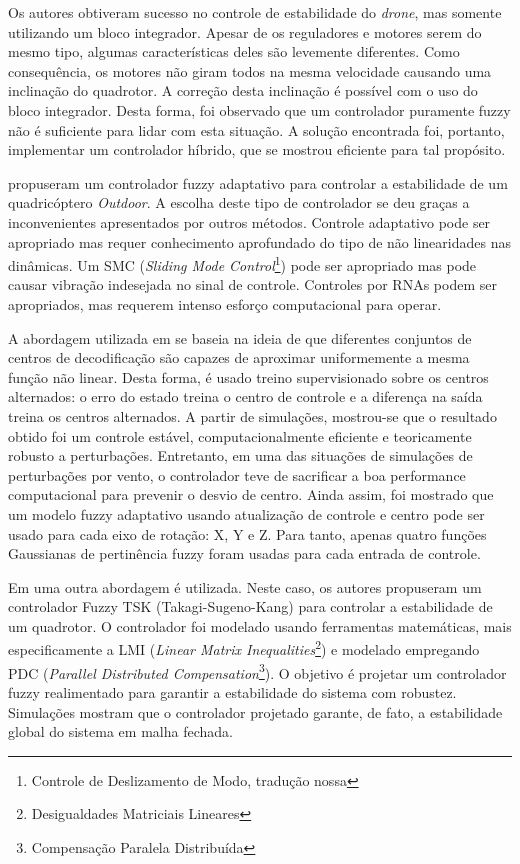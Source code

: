 Os autores obtiveram sucesso no controle de estabilidade do \textit{drone}, mas somente utilizando um bloco integrador. Apesar de os reguladores e motores serem do mesmo tipo, algumas características deles são levemente diferentes. Como consequência, os motores não giram todos na mesma velocidade causando uma inclinação do quadrotor. A correção desta inclinação é possível com o uso do bloco integrador. Desta forma, foi observado que um controlador puramente fuzzy não é suficiente para lidar com esta situação. A solução encontrada foi, portanto, implementar um controlador híbrido, que se mostrou eficiente para tal propósito.

 propuseram um controlador fuzzy adaptativo para controlar a estabilidade de um quadricóptero \textit{Outdoor}. A escolha deste tipo de controlador se deu graças a inconvenientes apresentados por outros métodos. Controle adaptativo pode ser apropriado mas requer conhecimento aprofundado do tipo de não linearidades nas dinâmicas. Um SMC (\textit{Sliding Mode Control}\footnote{Controle de Deslizamento de Modo, tradução nossa}) pode ser apropriado mas pode causar vibração indesejada no sinal de controle. Controles por RNAs podem ser apropriados, mas requerem intenso esforço computacional para operar.

A abordagem utilizada em \cite{Coza2006} se baseia na ideia de que diferentes conjuntos de centros de decodificação são capazes de aproximar uniformemente a mesma função não linear. Desta forma, é usado treino supervisionado sobre os centros alternados: o erro do estado treina o centro de controle e a diferença na saída treina os centros alternados. A partir de simulações, mostrou-se que o resultado obtido foi um controle estável, computacionalmente eficiente e teoricamente robusto a perturbações. Entretanto, em uma das situações de simulações de perturbações por vento, o controlador teve de sacrificar a boa performance computacional para prevenir o desvio de centro. Ainda assim, foi mostrado que um modelo fuzzy adaptativo usando atualização de controle e centro pode ser usado para cada eixo de rotação: X, Y e Z. Para tanto, apenas quatro funções Gaussianas de pertinência fuzzy foram usadas para cada entrada de controle.

Em \cite{Rabhi2011} uma outra abordagem é utilizada. Neste caso, os autores propuseram um controlador Fuzzy TSK (Takagi-Sugeno-Kang) para controlar a estabilidade de um quadrotor. O controlador foi modelado usando ferramentas matemáticas, mais especificamente a LMI (\textit{Linear Matrix Inequalities}\footnote{Desigualdades Matriciais Lineares}) e modelado empregando PDC (\textit{Parallel Distributed Compensation}\footnote{Compensação Paralela Distribuída}). O objetivo é projetar um controlador fuzzy realimentado para garantir a estabilidade do sistema com robustez. Simulações mostram que o controlador projetado garante, de fato, a estabilidade global do sistema em malha fechada.

